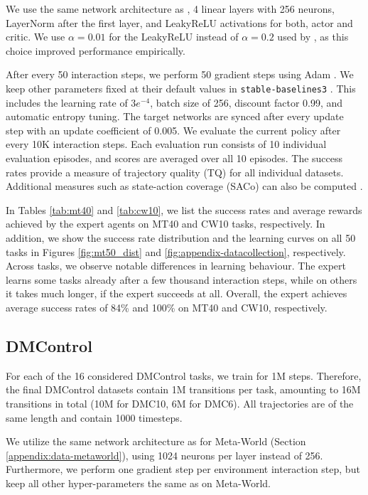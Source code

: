 We use the same network architecture as \citet{Wolczyk:21}, 4 linear layers with 256 neurons,  LayerNorm \citep{Ba:16} after the first layer, and LeakyReLU \citep{Maas:13} activations for both, actor and critic. We use $\alpha=0.01$ for the LeakyReLU instead of $\alpha=0.2$ used by \citet{Wolczyk:21}, as this choice improved performance empirically. 

After every 50 interaction steps, we perform 50 gradient steps using Adam \citep{Kingma:14}. We keep other parameters fixed at their default values in \texttt{stable-baselines3} \citep{Raffin:21}. This includes the learning rate of $3e^{-4}$, batch size of 256, discount factor 0.99, and automatic entropy tuning. The target networks are synced after every update step with an update coefficient of 0.005. We evaluate the current policy after every 10K interaction steps. Each evaluation run consists of 10 individual evaluation episodes, and scores are averaged over all 10 episodes. The success rates provide a measure of trajectory quality (TQ) for all individual datasets. Additional measures such as state-action coverage (SACo) can also be computed \citep{Schweighofer:22}.

In Tables \ref{tab:mt40} and \ref{tab:cw10}, we list the success rates and average rewards achieved by the expert agents on MT40 and CW10 tasks, respectively. In addition, we show the success rate distribution and the learning curves on all 50 tasks in Figures \ref{fig:mt50_dist} and  \ref{fig:appendix-datacollection}, respectively.
Across tasks, we observe notable differences in learning behaviour. The expert learns some tasks already after a few thousand interaction steps, while on others it takes much longer, if the expert succeeds at all. Overall, the expert achieves average success rates of 84\% and 100\% on MT40 and CW10, respectively.

\subsection{DMControl}
For each of the 16 considered DMControl tasks, we train for 1M steps. Therefore, the final DMControl datasets contain 1M transitions per task, amounting to 16M transitions in total (10M for DMC10, 6M for DMC6). All trajectories are of the same length and contain 1000 timesteps.

We utilize the same network architecture as for Meta-World (Section \ref{appendix:data-metaworld}), using 1024 neurons per layer instead of 256. Furthermore, we perform one gradient step per environment interaction step, but keep all other hyper-parameters the same as on Meta-World.

